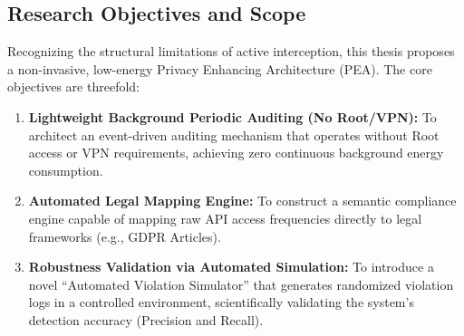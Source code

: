 \subsection{Research Objectives and Scope}
Recognizing the structural limitations of active interception, this thesis proposes a non-invasive, low-energy Privacy Enhancing Architecture (PEA). The core objectives are threefold:
\begin{enumerate}
    \item \textbf{Lightweight Background Periodic Auditing (No Root/VPN):} To architect an event-driven auditing mechanism that operates without Root access or VPN requirements, achieving zero continuous background energy consumption.
    \item \textbf{Automated Legal Mapping Engine:} To construct a semantic compliance engine capable of mapping raw API access frequencies directly to legal frameworks (e.g., GDPR Articles).
    \item \textbf{Robustness Validation via Automated Simulation:} To introduce a novel ``Automated Violation Simulator'' that generates randomized violation logs in a controlled environment, scientifically validating the system's detection accuracy (Precision and Recall).
\end{enumerate}